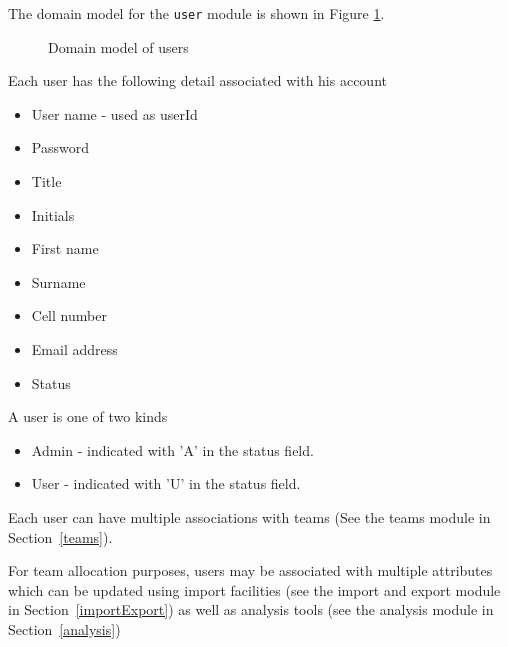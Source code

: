 The domain model for the \texttt{user} module is shown in Figure \ref{fig:users_domainModel}.

\begin{figure}[htb]
\begin{center}
\end{center}
\caption{ \label{fig:users_domainModel} Domain model of users}
\end{figure}

Each user has the following detail associated with his account
\begin{itemize}

\item User name - used as userId
\item Password
\item Title
\item Initials
\item First name
\item Surname
\item Cell number
\item Email address
\item Status
\end{itemize}

A user is one of two kinds
\begin{itemize}
\item  Admin - indicated with 'A' in the status field.
\item User - indicated with 'U' in the status field.
\end{itemize}

Each user can have multiple associations with teams (See the teams module in Section~\ref{teams}).  

For team allocation purposes, users may be associated with multiple attributes which can be updated using import facilities (see the import and export module in Section~\ref{importExport}) as well as analysis tools (see the analysis module in Section~\ref{analysis})  